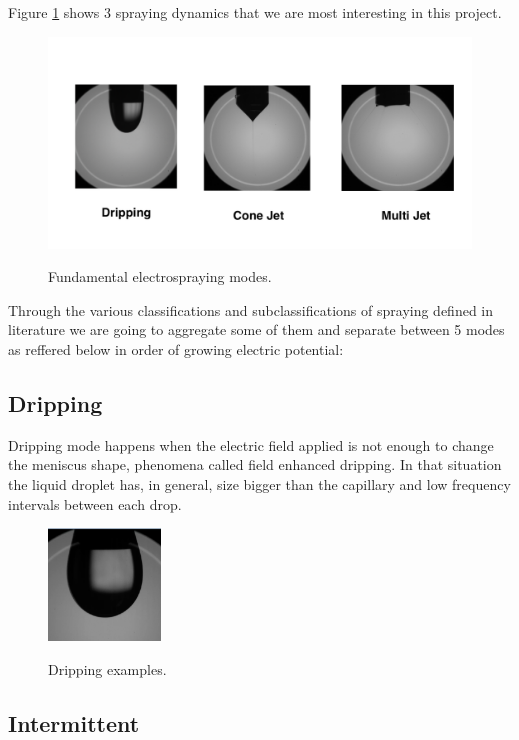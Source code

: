 Figure \ref{fig:spraying_modes} shows 3 spraying dynamics that we are most interesting in this project. 


  \begin{figure}[H]
      \center
      \includegraphics[width=15cm]{Figuras/spraying_modes.png}
      \label{fig:spraying_modes}
      \caption{Fundamental electrospraying modes.}
  \end{figure}


Through the various classifications and subclassifications of spraying defined in literature we are going to aggregate some of them and separate between 5 modes as reffered below in order of growing electric potential:

\subsection{Dripping}
\label{subsec:dripping}

Dripping mode happens when the electric field applied is not enough to change the meniscus shape, phenomena called field enhanced dripping.
In that situation the liquid droplet has, in general, size bigger than the capillary and low frequency intervals between each drop.

\begin{figure}[H]
  \center
  \includegraphics[width=3cm]{Figuras/19:03/drip_example.png}
  \label{fig:drip_example}
  \caption{Dripping examples.}
\end{figure}

\subsection{Intermittent}
\label{subsec:Intermittent}

